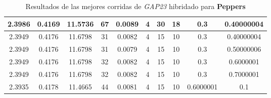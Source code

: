 \begin{table}[h!]
\begin{center}
\begin{tabular}{|c|c|c|c|c|c|c|c|c|c|}
        \hline
        \hline
            2.3986 & 0.4169  & 11.5736 & 67 & 0.0089 & 4 & 30 & 18 & 0.3 & 0.40000004\\
        \hline
        \hline
            2.3949 & 0.4176  & 11.6798 & 31 & 0.0082 & 4 & 15 & 10 & 0.3 & 0.40000004\\
        \hline
        \hline
            2.3949 & 0.4176  & 11.6798 & 31 & 0.0079 & 4 & 15 & 10 & 0.3 & 0.50000006\\
        \hline
        \hline
            2.3949 & 0.4176  & 11.6798 & 32 & 0.0082 & 4 & 15 & 10 & 0.3 & 0.6000001\\
        \hline
        \hline
            2.3949 & 0.4176  & 11.6798 & 32 & 0.0082 & 4 & 15 & 10 & 0.3 & 0.7000001\\
        \hline
        \hline
            2.3935 & 0.4178  & 11.4665 & 44 & 0.0081 & 4 & 15 & 10 & 0.6000001 & 0.1\\
        \hline
        \end{tabular}
        \caption{Resultados de las mejores corridas de \emph{GAP23} hibridado para {\bf Peppers}}
        \label{tb:tableGAP23}
    \end{center}
\end{table}
